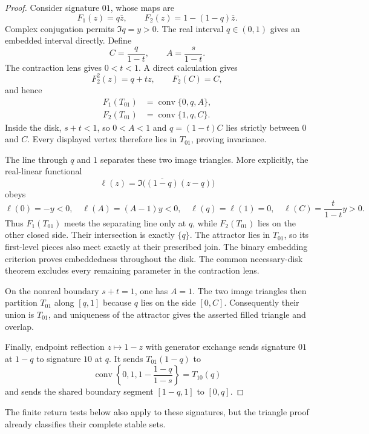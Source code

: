\begin{proof}
Consider signature $01$, whose maps are
\[
 F_1(z)=q\overline z,\qquad
 F_2(z)=1-(1-q)\overline z.
\]
Complex conjugation permits $\Im q=y>0$. The real interval
$q\in(0,1)$ gives an embedded interval directly. Define
\[
 C=\frac{q}{1-t},\qquad A=\frac{s}{1-t}.
\]
The contraction lens gives $0<t<1$. A direct calculation gives
\[
 F_2^2(z)=q+tz,\qquad F_2(C)=C,
\]
and hence
\begin{align*}
 F_1(T_{01})&=\operatorname{conv}\{0,q,A\},\\
 F_2(T_{01})&=\operatorname{conv}\{1,q,C\}.
\end{align*}
Inside the disk, $s+t<1$, so $0<A<1$ and
$q=(1-t)C$ lies strictly between $0$ and $C$. Every displayed vertex
therefore lies in $T_{01}$, proving invariance.

The line through $q$ and $1$ separates these two image triangles.
More explicitly, the real-linear functional
\[
 \ell(z)=\Im\bigl(\overline{(1-q)}(z-q)\bigr)
\]
obeys
\[
 \ell(0)=-y<0,\quad
 \ell(A)=(A-1)y<0,\quad
 \ell(q)=\ell(1)=0,\quad
 \ell(C)=\frac{t}{1-t}y>0.
\]
Thus $F_1(T_{01})$ meets the separating line only at $q$, while
$F_2(T_{01})$ lies on the other closed side. Their intersection is
exactly $\{q\}$. The attractor lies in $T_{01}$, so its first-level
pieces also meet exactly at their prescribed join. The binary
embedding criterion proves embeddedness throughout the disk.
The common necessary-disk theorem excludes every remaining parameter
in the contraction lens.

On the nonreal boundary $s+t=1$, one has $A=1$. The two image
triangles then partition $T_{01}$ along $[q,1]$ because $q$ lies on
the side $[0,C]$. Consequently their union is $T_{01}$, and uniqueness
of the attractor gives the asserted filled triangle and overlap.

Finally, endpoint reflection $z\mapsto1-z$ with generator exchange
sends signature $01$ at $1-q$ to signature $10$ at $q$. It sends
$T_{01}(1-q)$ to
\[
 \operatorname{conv}\left\{0,1,
 1-\frac{1-q}{1-s}\right\}
 =T_{10}(q)
\]
and sends the shared boundary segment $[1-q,1]$ to $[0,q]$.
\end{proof}

The finite return tests below also apply to these signatures, but the
triangle proof already classifies their complete stable sets.
